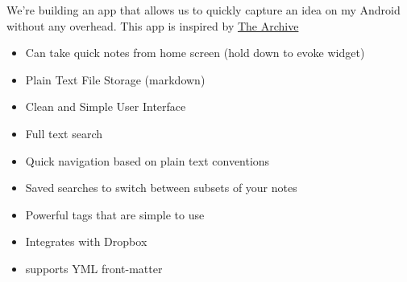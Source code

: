\documentclass[11pt]{article}
\begin{document}
    We're building an app that allows us to quickly capture an idea on my Android without any overhead.
    This app is inspired by  \href{https://zettelkasten.de/the-archive/}{The Archive}

    \begin{itemize}
        \item Can take quick notes from home screen (hold down to evoke widget)
        \item Plain Text File Storage (markdown)
        \item Clean and Simple User Interface
        \item Full text search
        \item Quick navigation based on plain text conventions
        \item Saved searches to switch between subsets of your notes
        \item Powerful tags that are simple to use
        \item Integrates with Dropbox
        \item supports YML front-matter
    \end{itemize}
\end{document}

